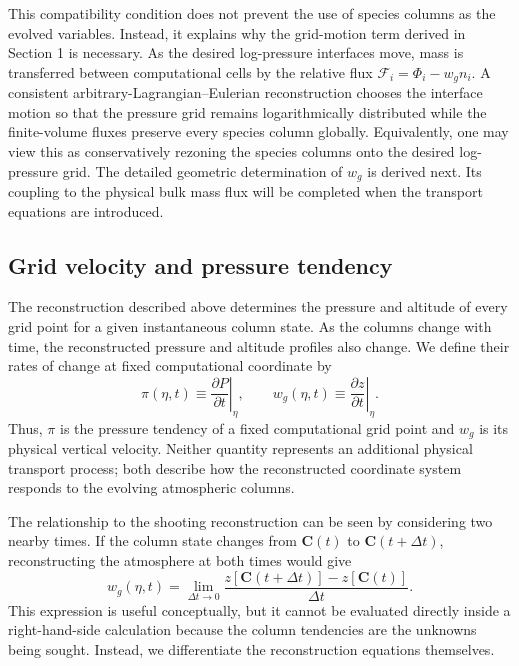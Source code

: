 \documentclass[twocolumn]{aastex631}
\begin{document}
This compatibility condition does not prevent the use of species columns as
the evolved variables. Instead, it explains why the grid-motion term derived
in Section 1 is necessary. As the desired log-pressure interfaces move, mass
is transferred between computational cells by the relative flux
$\mathcal{F}_i=\Phi_i-w_g n_i$. A consistent arbitrary-Lagrangian--Eulerian
reconstruction chooses the interface motion so that the pressure grid remains
logarithmically distributed while the finite-volume fluxes preserve every
species column globally. Equivalently, one may view this as conservatively
rezoning the species columns onto the desired log-pressure grid. The detailed
geometric determination of $w_g$ is derived next. Its coupling to the physical
bulk mass flux will be completed when the transport equations are introduced.

\subsection{Grid velocity and pressure tendency}
\label{sec:grid_velocity}

The reconstruction described above determines the pressure and altitude of
every grid point for a given instantaneous column state. As the columns change
with time, the reconstructed pressure and altitude profiles also change. We
define their rates of change at fixed computational coordinate by
\begin{equation}
  \pi(\eta,t)
  \equiv
  \left.\frac{\partial P}{\partial t}\right|_\eta,
  \qquad
  w_g(\eta,t)
  \equiv
  \left.\frac{\partial z}{\partial t}\right|_\eta .
  \label{eq:pressure_and_grid_velocity}
\end{equation}
Thus, $\pi$ is the pressure tendency of a fixed computational grid point and
$w_g$ is its physical vertical velocity. Neither quantity represents an
additional physical transport process; both describe how the reconstructed
coordinate system responds to the evolving atmospheric columns.

The relationship to the shooting reconstruction can be seen by considering
two nearby times. If the column state changes from $\bm{C}(t)$ to
$\bm{C}(t+\Delta t)$, reconstructing the atmosphere at both times would give
\begin{equation}
  w_g(\eta,t)
  =
  \lim_{\Delta t\rightarrow 0}
  \frac{z[\bm{C}(t+\Delta t)]-z[\bm{C}(t)]}{\Delta t}.
  \label{eq:grid_velocity_limit}
\end{equation}
This expression is useful conceptually, but it cannot be evaluated directly
inside a right-hand-side calculation because the column tendencies are the
unknowns being sought. Instead, we differentiate the reconstruction equations
themselves.
\end{document}
